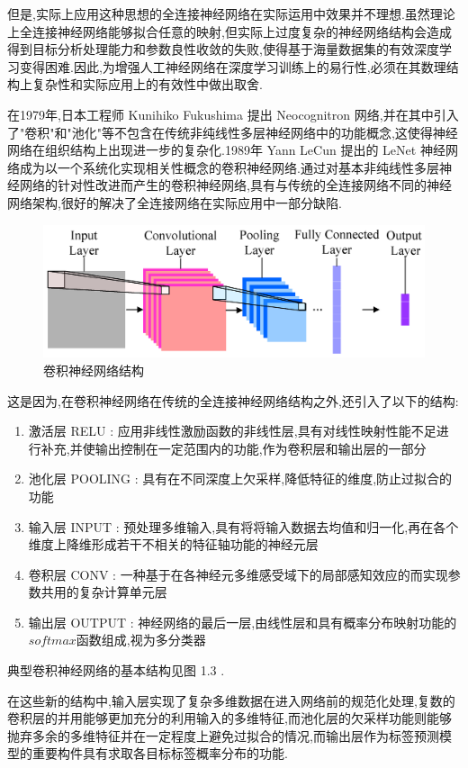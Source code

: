 但是,实际上应用这种思想的全连接神经网络在实际运用中效果并不理想.虽然理论上全连接神经网络能够拟合任意的映射,但实际上过度复杂的神经网络结构会造成得到目标分析处理能力和参数良性收敛的失败,使得基于海量数据集的有效深度学习变得困难.因此,为增强人工神经网络在深度学习训练上的易行性,必须在其数理结构上复杂性和实际应用上的有效性中做出取舍.

在1979年,日本工程师 Kunihiko Fukushima 提出 Neocognitron 网络,并在其中引入了"卷积"和"池化"等不包含在传统非纯线性多层神经网络中的功能概念,这使得神经网络在组织结构上出现进一步的复杂化.1989年 Yann LeCun 提出的 LeNet 神经网络成为以一个系统化实现相关性概念的卷积神经网络.通过对基本非纯线性多层神经网络的针对性改进而产生的卷积神经网络,具有与传统的全连接网络不同的神经网络架构,很好的解决了全连接网络在实际应用中一部分缺陷.

\begin{figure}
\centering
\includegraphics[scale=1]{Figures/CNN3.png}
\caption{卷积神经网络结构}
\end{figure}

这是因为,在卷积神经网络在传统的全连接神经网络结构之外,还引入了以下的结构:
\begin{enumerate}
	\item 激活层 RELU : 应用非线性激励函数的非线性层,具有对线性映射性能不足进行补充,并使输出控制在一定范围内的功能,作为卷积层和输出层的一部分
	\item 池化层 POOLING : 具有在不同深度上欠采样,降低特征的维度,防止过拟合的功能
	\item 输入层 INPUT : 预处理多维输入,具有将将输入数据去均值和归一化,再在各个维度上降维形成若干不相关的特征轴功能的神经元层
	\item 卷积层 CONV : 一种基于在各神经元多维感受域下的局部感知效应的而实现参数共用的复杂计算单元层
	\item 输出层 OUTPUT : 神经网络的最后一层,由线性层和具有概率分布映射功能的$softmax$函数组成,视为多分类器
\end{enumerate}

典型卷积神经网络的基本结构见图 1.3 .

在这些新的结构中,输入层实现了复杂多维数据在进入网络前的规范化处理,复数的卷积层的并用能够更加充分的利用输入的多维特征,而池化层的欠采样功能则能够抛弃多余的多维特征并在一定程度上避免过拟合的情况,而输出层作为标签预测模型的重要构件具有求取各目标标签概率分布的功能.

